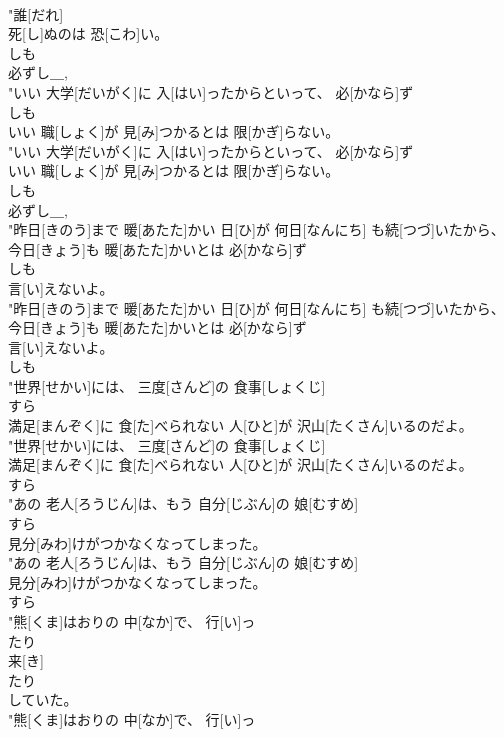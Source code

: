 \documentclass[8pt]{extreport}
\begin{document}
\begin{CJK}{UTF8}{min}
\\	"誰[だれ]
\\	死[し]ぬのは 恐[こわ]い。
\\	しも
\\	必ずし＿, 
\\	"いい 大学[だいがく]に 入[はい]ったからといって、 必[かなら]ず
\\	しも
\\	いい 職[しょく]が 見[み]つかるとは 限[かぎ]らない。
\\	"いい 大学[だいがく]に 入[はい]ったからといって、 必[かなら]ず
\\	いい 職[しょく]が 見[み]つかるとは 限[かぎ]らない。
\\	しも
\\	必ずし＿, 
\\	"昨日[きのう]まで 暖[あたた]かい 日[ひ]が 何日[なんにち] も続[つづ]いたから、 今日[きょう]も 暖[あたた]かいとは 必[かなら]ず
\\	しも
\\	言[い]えないよ。
\\	"昨日[きのう]まで 暖[あたた]かい 日[ひ]が 何日[なんにち] も続[つづ]いたから、 今日[きょう]も 暖[あたた]かいとは 必[かなら]ず
\\	言[い]えないよ。
\\	しも
\\	"世界[せかい]には、 三度[さんど]の 食事[しょくじ]
\\	すら
\\	満足[まんぞく]に 食[た]べられない 人[ひと]が 沢山[たくさん]いるのだよ。
\\	"世界[せかい]には、 三度[さんど]の 食事[しょくじ]
\\	満足[まんぞく]に 食[た]べられない 人[ひと]が 沢山[たくさん]いるのだよ。
\\	すら
\\	"あの 老人[ろうじん]は、もう 自分[じぶん]の 娘[むすめ]
\\	すら
\\	見分[みわ]けがつかなくなってしまった。
\\	"あの 老人[ろうじん]は、もう 自分[じぶん]の 娘[むすめ]
\\	見分[みわ]けがつかなくなってしまった。
\\	すら
\\	"熊[くま]はおりの 中[なか]で、 行[い]っ
\\	たり
\\	来[き]
\\	たり
\\	していた。
\\	"熊[くま]はおりの 中[なか]で、 行[い]っ

\end{CJK}
\end{document}
